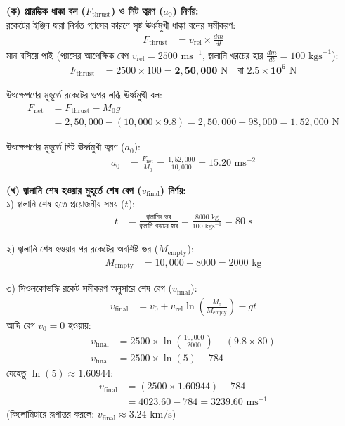 \documentclass[12pt, a4paper]{article}
\begin{document}
\begin{tcolorbox}[solutionbox={সমাধান (Solution)}]
\noindent
\textbf{(ক) প্রারম্ভিক ধাক্কা বল ($F_{\text{thrust}}$) ও নিট ত্বরণ ($a_0$) নির্ণয়:} \\
রকেটের ইঞ্জিন দ্বারা নির্গত গ্যাসের কারণে সৃষ্ট ঊর্ধ্বমুখী ধাক্কা বলের সমীকরণ:
\begin{align*}
    F_{\text{thrust}} &= v_{\text{rel}} \times \frac{dm}{dt}
\end{align*}
মান বসিয়ে পাই (গ্যাসের আপেক্ষিক বেগ $v_{\text{rel}} = 2500\text{ ms}^{-1}$, জ্বালানি খরচের হার $\frac{dm}{dt} = 100\text{ kgs}^{-1}$):
\begin{align*}
    F_{\text{thrust}} &= 2500 \times 100 = \mathbf{2,50,000}\text{ N} \quad \text{বা } \mathbf{2.5 \times 10^5}\text{ N}
\end{align*}

উৎক্ষেপণের মুহূর্তে রকেটের ওপর লব্ধি ঊর্ধ্বমুখী বল:
\begin{align*}
    F_{\text{net}} &= F_{\text{thrust}} - M_0 g \\
                   &= 2,50,000 - (10,000 \times 9.8) = 2,50,000 - 98,000 = 1,52,000\text{ N}
\end{align*}

উৎক্ষেপণের মুহূর্তে নিট ঊর্ধ্বমুখী ত্বরণ ($a_0$):
\begin{align*}
    a_0 &= \frac{F_{\text{net}}}{M_0} = \frac{1,52,000}{10,000} = \mathbf{15.20}\text{ ms}^{-2}
\end{align*}

\vspace{0.5em}
\noindent\textbf{(খ) জ্বালানি শেষ হওয়ার মুহূর্তে শেষ বেগ ($v_{\text{final}}$) নির্ণয়:} \\
১) জ্বালানি শেষ হতে প্রয়োজনীয় সময় ($t$):
\begin{align*}
    t &= \frac{\text{জ্বালানির ভর}}{\text{জ্বালানি খরচের হার}} = \frac{8000\text{ kg}}{100\text{ kgs}^{-1}} = 80\text{ s}
\end{align*}

২) জ্বালানি শেষ হওয়ার পর রকেটের অবশিষ্ট ভর ($M_{\text{empty}}$):
\begin{align*}
    M_{\text{empty}} &= 10,000 - 8000 = 2000\text{ kg}
\end{align*}

৩) সিওলকোভস্কি রকেট সমীকরণ অনুসারে শেষ বেগ ($v_{\text{final}}$):
\begin{align*}
    v_{\text{final}} &= v_0 + v_{\text{rel}} \ln\left(\frac{M_0}{M_{\text{empty}}}\right) - g t
\end{align*}
আদি বেগ $v_0 = 0$ হওয়ায়:
\begin{align*}
    v_{\text{final}} &= 2500 \times \ln\left(\frac{10,000}{2000}\right) - (9.8 \times 80) \\
    v_{\text{final}} &= 2500 \times \ln(5) - 784
\end{align*}
যেহেতু $\ln(5) \approx 1.60944$:
\begin{align*}
    v_{\text{final}} &= (2500 \times 1.60944) - 784 \\
                       &= 4023.60 - 784 = \mathbf{3239.60}\text{ ms}^{-1}
\end{align*}
(কিলোমিটারে রূপান্তর করলে: $v_{\text{final}} \approx \mathbf{3.24}\text{ km/s}$)
\end{tcolorbox}
\end{document}
